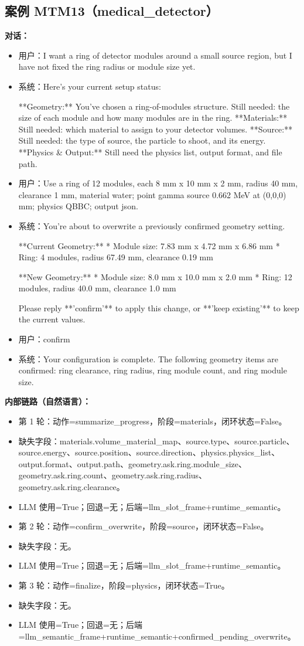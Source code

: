 \documentclass[11pt]{ctexart}
\begin{document}
\subsection{案例 MTM13（medical\_detector）}
\textbf{对话：}
\begin{itemize}
\item 用户：I want a ring of detector modules around a small source region, but I have not fixed the ring radius or module size yet.
\item 系统：Here's your current setup status:

**Geometry:** You've chosen a ring-of-modules structure. Still needed: the size of each module and how many modules are in the ring.
**Materials:** Still needed: which material to assign to your detector volumes.
**Source:** Still needed: the type of source, the particle to shoot, and its energy.
**Physics \& Output:** Still need the physics list, output format, and file path.
\item 用户：Use a ring of 12 modules, each 8 mm x 10 mm x 2 mm, radius 40 mm, clearance 1 mm, material water; point gamma source 0.662 MeV at (0,0,0) mm; physics QBBC; output json.
\item 系统：You're about to overwrite a previously confirmed geometry setting.

**Current Geometry:**
*   Module size: 7.83 mm x 4.72 mm x 6.86 mm
*   Ring: 4 modules, radius 67.49 mm, clearance 0.19 mm

**New Geometry:**
*   Module size: 8.0 mm x 10.0 mm x 2.0 mm
*   Ring: 12 modules, radius 40.0 mm, clearance 1.0 mm

Please reply **'confirm'** to apply this change, or **'keep existing'** to keep the current values.
\item 用户：confirm
\item 系统：Your configuration is complete. The following geometry items are confirmed: ring clearance, ring radius, ring module count, and ring module size.
\end{itemize}
\textbf{内部链路（自然语言）：}
\begin{itemize}
\item 第 1 轮：动作=summarize\_progress，阶段=materials，闭环状态=False。
\item 缺失字段：materials.volume\_material\_map、source.type、source.particle、source.energy、source.position、source.direction、physics.physics\_list、output.format、output.path、geometry.ask.ring.module\_size、geometry.ask.ring.count、geometry.ask.ring.radius、geometry.ask.ring.clearance。
\item LLM 使用=True；回退=无；后端=llm\_slot\_frame+runtime\_semantic。
\item 第 2 轮：动作=confirm\_overwrite，阶段=source，闭环状态=False。
\item 缺失字段：无。
\item LLM 使用=True；回退=无；后端=llm\_slot\_frame+runtime\_semantic。
\item 第 3 轮：动作=finalize，阶段=physics，闭环状态=True。
\item 缺失字段：无。
\item LLM 使用=True；回退=无；后端=llm\_semantic\_frame+runtime\_semantic+confirmed\_pending\_overwrite。
\end{itemize}
\end{document}
